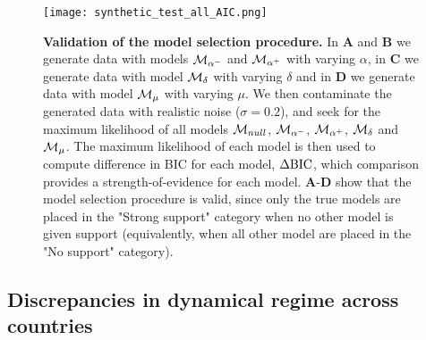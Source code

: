 \begin{figure}
  \centering
  \texttt{[image: synthetic\_test\_all\_AIC.png]}
  \caption{\small
  \textbf{Validation of the model selection procedure.} In \textbf{A} and $\textbf{B}$ we generate data with models $\mathcal{M}_{\alpha^-}$ and $\mathcal{M}_{\alpha^+}$ with varying $\alpha$, in \textbf{C} we generate data with model $\mathcal{M}_\delta$ with varying $\delta$ and in \textbf{D} we generate data with model $\mathcal{M}_\mu$ with varying $\mu$. We then contaminate the generated data with realistic noise ($\sigma = 0.2$), and seek for the maximum likelihood of all models $\mathcal{M}_{null}$, $\mathcal{M}_{\alpha^-}$, $\mathcal{M}_{\alpha^+}$, $\mathcal{M}_\delta$ and $\mathcal{M}_\mu$. The maximum likelihood of each model is then used to compute difference in BIC for each model, $\Delta \text{BIC}$, which comparison provides a strength-of-evidence for each model. 
  \textbf{A}-\textbf{D} show that the model selection procedure is valid, since only the true models are placed in the "Strong support" category when no other model is given support (equivalently, when all other model are placed in the "No support" category).}
  \label{fig:synthetic_test_all_AIC}
\end{figure}
\FloatBarrier

\subsection{Discrepancies in dynamical regime across countries}

